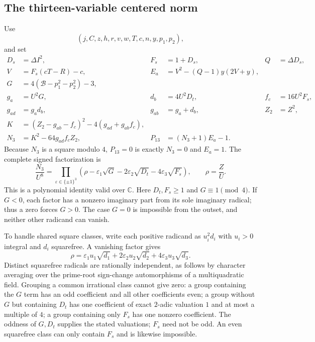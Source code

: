 \subsection{The thirteen-variable centered norm}
Use
\[
 (j,C,z,h,r,v,w,T,c,n,y,p_1,p_2),
\]
and set
\begin{align*}
 D_s&=\Delta I^2,&F_s&=1+D_s,&Q&=\Delta D_s,\\
 V&=F_s(cT-R)-c,&E_a&=V^2-(Q-1)y(2V+y),\\
 G&=4(\mathcal B-p_1^2-p_2^2)-3,\\
 g_a&=U^2G,&d_b&=4U^2D_t,&f_c&=16U^2F_s,\\
 g_{ad}&=g_ad_b,&g_{ab}&=g_a+d_b,&Z_2&=Z^2,\\
 K&=(Z_2-g_{ab}-f_c)^2-4(g_{ad}+g_{ab}f_c),\\
 N_3&=K^2-64g_{ad}f_cZ_2,&P_{13}&=(N_3+1)E_a-1.
\end{align*}
Because $N_3$ is a square modulo $4$, $P_{13}=0$ is exactly $N_3=0$ and
$E_a=1$. The complete signed factorization is
\begin{equation}\label{eq:center-three-factor}
 \frac{N_3}{U^8}
 =\prod_{\varepsilon\in\{\pm1\}^3}
 \left(\rho-\varepsilon_1\sqrt G
 -2\varepsilon_2\sqrt{D_t}-4\varepsilon_3\sqrt{F_s}\right),
 \qquad \rho=\frac ZU.
\end{equation}
This is a polynomial identity valid over $\mathbb C$. Here $D_t,F_s\ge1$
and $G\equiv1\pmod4$. If $G<0$, each factor has a nonzero imaginary part
from its sole imaginary radical; thus a zero forces $G>0$. The case $G=0$
is impossible from the outset, and neither other radicand can vanish.

To handle shared square classes, write each positive radicand as $u_i^2d_i$
with $u_i>0$ integral and $d_i$ squarefree. A vanishing factor gives
\[
 \rho=\varepsilon_1u_1\sqrt{d_1}
       +2\varepsilon_2u_2\sqrt{d_2}
       +4\varepsilon_3u_3\sqrt{d_3}.
\]
Distinct squarefree radicals are rationally independent, as follows by
character averaging over the prime-root sign-change automorphisms of a
multiquadratic field. Grouping a common irrational class cannot give zero:
a group containing the $G$ term has an odd coefficient and all other
coefficients even; a group without $G$ but containing $D_t$ has one
coefficient of exact $2$-adic valuation $1$ and at most a multiple of $4$;
a group containing only $F_s$ has one nonzero coefficient. The oddness of
$G,D_t$ supplies the stated valuations; $F_s$ need not be odd. An even
squarefree class can only contain $F_s$ and is likewise impossible.

